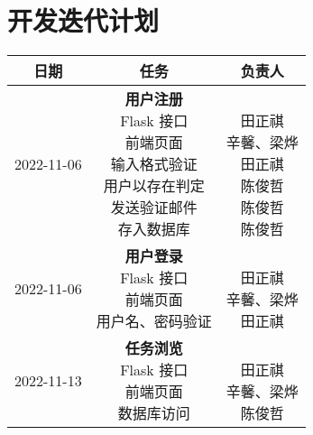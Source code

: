 \section{开发迭代计划}

\begin{table}[h!]
    \centering
    \begin{tabular}{ccc}\toprule
        \textbf{日期} & \textbf{任务} & \textbf{负责人} \\\midrule
        2022-11-06 & \makecell[l]{\textbf{用户注册} \\
            Flask 接口 \\
            前端页面 \\
            输入格式验证 \\
            用户以存在判定 \\
            发送验证邮件 \\
            存入数据库
        } & \makecell{ \\
            田正祺 \\
            辛馨、梁烨 \\
            田正祺 \\
            陈俊哲 \\
            陈俊哲 \\
            陈俊哲 \\
        } \\\midrule
        2022-11-06 & \makecell[l]{\textbf{用户登录} \\
            Flask 接口 \\
            前端页面 \\
            用户名、密码验证 \\
        } & \makecell{ \\
            田正祺 \\
            辛馨、梁烨 \\
            田正祺 \\
        } \\\midrule
        2022-11-13 & \makecell[l]{\textbf{任务浏览} \\
            Flask 接口 \\
            前端页面 \\
            数据库访问 \\
        } & \makecell{ \\
            田正祺 \\
            辛馨、梁烨 \\
            陈俊哲 \\
        } \\\midrule

\end{tabular}
\end{table}
